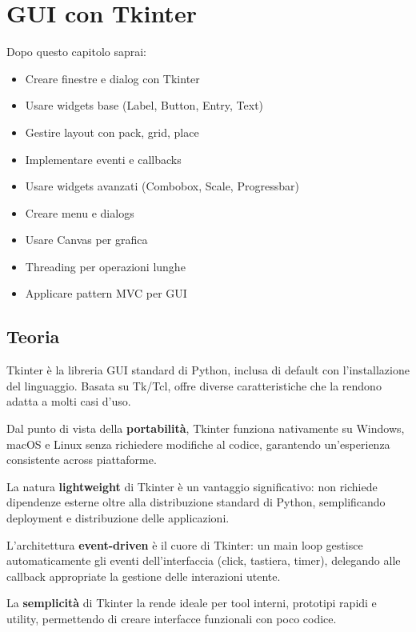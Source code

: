 \chapter{GUI con Tkinter}

\begin{tcolorbox}[title=Obiettivi del capitolo]
Dopo questo capitolo saprai:
\begin{itemize}
  \item Creare finestre e dialog con Tkinter
  \item Usare widgets base (Label, Button, Entry, Text)
  \item Gestire layout con pack, grid, place
  \item Implementare eventi e callbacks
  \item Usare widgets avanzati (Combobox, Scale, Progressbar)
  \item Creare menu e dialogs
  \item Usare Canvas per grafica
  \item Threading per operazioni lunghe
  \item Applicare pattern MVC per GUI
\end{itemize}
\end{tcolorbox}

\section{Teoria}

Tkinter è la libreria GUI standard di Python, inclusa di default con l'installazione del linguaggio. Basata su Tk/Tcl, offre diverse caratteristiche che la rendono adatta a molti casi d'uso.

Dal punto di vista della \textbf{portabilità}, Tkinter funziona nativamente su Windows, macOS e Linux senza richiedere modifiche al codice, garantendo un'esperienza consistente across piattaforme.

La natura \textbf{lightweight} di Tkinter è un vantaggio significativo: non richiede dipendenze esterne oltre alla distribuzione standard di Python, semplificando deployment e distribuzione delle applicazioni.

L'architettura \textbf{event-driven} è il cuore di Tkinter: un main loop gestisce automaticamente gli eventi dell'interfaccia (click, tastiera, timer), delegando alle callback appropriate la gestione delle interazioni utente.

La \textbf{semplicità} di Tkinter la rende ideale per tool interni, prototipi rapidi e utility, permettendo di creare interfacce funzionali con poco codice.

